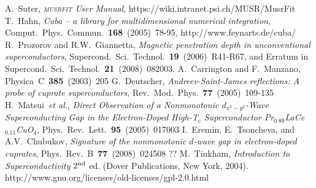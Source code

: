 \documentclass[twoside]{article}
\newcommand{\musrfit}{\textsc{musrfit}\xspace}
\begin{document}

\begin{thebibliography}{1}

 A.~Suter, \textit{\musrfit User Manual}, https://wiki.intranet.psi.ch/MUSR/MusrFit
 T.~Hahn, \textit{Cuba -- a library for multidimensional numerical integration}, Comput.~Phys.~Commun.~\textbf{168}~(2005)~78-95, http://www.feynarts.de/cuba/
 R.~Prozorov and R.W.~Giannetta, \textit{Magnetic penetration depth in unconventional superconductors}, Supercond.\ Sci.\ Technol.\ \textbf{19}~(2006)~R41-R67, and Erratum in Supercond.\ Sci.\ Technol.\ \textbf{21}~(2008)~082003.
 A.~Carrington and F.~Manzano, Physica~C~\textbf{385}~(2003)~205
 G.~Deutscher, \textit{Andreev-Saint-James reflections: A probe of cuprate superconductors}, Rev.~Mod.~Phys.~\textbf{77}~(2005)~109-135
 H.~Matsui~\textit{et al.}, \textit{Direct Observation of a Nonmonotonic $d_{x^2-y^2}$-Wave Superconducting Gap in the Electron-Doped High-T$_{\mathrm c}$ Superconductor Pr$_{0.89}$LaCe$_{0.11}$CuO$_4$}, Phys.~Rev.~Lett.~\textbf{95}~(2005)~017003
 I.~Eremin, E.~Tsoncheva, and A.V.~Chubukov, \textit{Signature of the nonmonotonic $d$-wave gap in electron-doped cuprates}, Phys.~Rev.~B~\textbf{77}~(2008)~024508
 ??
 M.~Tinkham, \textit{Introduction to Superconductivity} $2^{\rm nd}$ ed. (Dover Publications, New York, 2004).
 http://www.gnu.org/licenses/old-licenses/gpl-2.0.html

\end{thebibliography}
\end{document}
